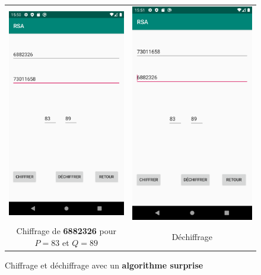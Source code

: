 \documentclass{article}
\begin{document}
\begin{figure}[b!]
    \centering
    \begin{tabular}{cc}
      \includegraphics[width=.35\linewidth]{./img/RSA_e.png} &
      \includegraphics[width=.35\linewidth]{./img/RSA_d.png} \\
      Chiffrage de \textbf{6882326} pour $P=83$ et $Q=89$ & Déchiffrage \\
    \end{tabular}
    \caption{Chiffrage et déchiffrage avec un \textbf{algorithme surprise}}\label{fig:RSA}
\end{figure}




\nocite{*}
\end{document}
